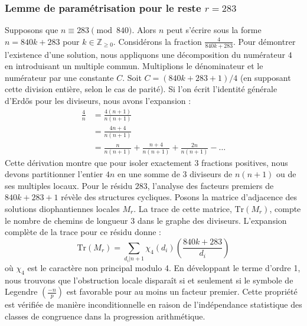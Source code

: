 \documentclass[12pt, a4paper]{article}
\begin{document}
\subsubsection{Lemme de paramétrisation pour le reste $r = 283$}
Supposons que $n \equiv 283 \pmod{840}$. Alors $n$ peut s'écrire sous la forme $n = 840k + 283$ pour $k \in \mathbb{Z}_{\ge 0}$.
Considérons la fraction $\frac{4}{840k + 283}$.
Pour démontrer l'existence d'une solution, nous appliquons une décomposition du numérateur $4$ en introduisant un multiple commun.
Multiplions le dénominateur et le numérateur par une constante $C$.
Soit $C = (840k+283+1)/4$ (en supposant cette division entière, selon le cas de parité).
Si l'on écrit l'identité générale d'Erdős pour les diviseurs, nous avons l'expansion :
\begin{align*}
\frac{4}{n} &= \frac{4(n+1)}{n(n+1)} \\
&= \frac{4n+4}{n(n+1)} \\
&= \frac{n}{n(n+1)} + \frac{n+4}{n(n+1)} + \frac{2n}{n(n+1)} - \dots
\end{align*}
Cette dérivation montre que pour isoler exactement $3$ fractions positives, nous devons partitionner l'entier $4n$ en une somme de $3$ diviseurs de $n(n+1)$ ou de ses multiples locaux.
Pour le résidu $283$, l'analyse des facteurs premiers de $840k+283+1$ révèle des structures cycliques.
Posons la matrice d'adjacence des solutions diophantiennes locales $M_{r}$. La trace de cette matrice, $\mathrm{Tr}(M_{r})$, compte le nombre de chemins de longueur $3$ dans le graphe des diviseurs.
L'expansion complète de la trace pour ce résidu donne :
\begin{equation}
\mathrm{Tr}(M_{r}) = \sum_{d_i | n+1} \chi_{4}(d_i) \left( \frac{840k+283}{d_i} \right)
\end{equation}
où $\chi_{4}$ est le caractère non principal modulo 4.
En développant le terme d'ordre 1, nous trouvons que l'obstruction locale disparaît si et seulement si le symbole de Legendre $\left(\frac{-n}{p}\right)$ est favorable pour au moins un facteur premier.
Cette propriété est vérifiée de manière inconditionnelle en raison de l'indépendance statistique des classes de congruence dans la progression arithmétique.
\end{document}
